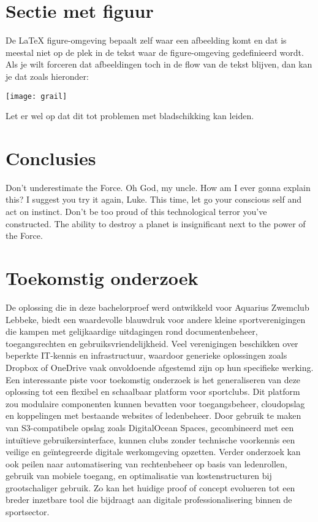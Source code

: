 \documentclass[a0,portrait]{hogent-poster}
\begin{document}
\begin{multicols}{2}
\section{Sectie met figuur}

De {\LaTeX} figure-omgeving bepaalt zelf waar een afbeelding komt en dat is meestal niet op de plek in de tekst waar de figure-omgeving gedefinieerd wordt. Als je wilt forceren dat afbeeldingen toch in de flow van de tekst blijven, dan kan je dat zoals hieronder:

\begin{center}
  \captionsetup{type=figure}
  \texttt{[image: grail]}
\end{center}

Let er wel op dat dit tot problemen met bladschikking kan leiden.

\section{Conclusies}

Don't underestimate the Force. Oh God, my uncle. How am I ever gonna explain this? I suggest you try it again, Luke. This time, let go your conscious self and act on instinct. Don't be too proud of this technological terror you've constructed. The ability to destroy a planet is insignificant next to the power of the Force.

\section{Toekomstig onderzoek}

De oplossing die in deze bachelorproef werd ontwikkeld voor Aquarius Zwemclub Lebbeke, 
biedt een waardevolle blauwdruk voor andere kleine sportverenigingen die kampen met gelijkaardige uitdagingen rond documentenbeheer, 
toegangsrechten en gebruiksvriendelijkheid. Veel verenigingen beschikken over beperkte IT-kennis en infrastructuur, 
waardoor generieke oplossingen zoals Dropbox of OneDrive vaak onvoldoende afgestemd zijn op hun specifieke werking. 
Een interessante piste voor toekomstig onderzoek is het generaliseren van deze oplossing tot een flexibel en schaalbaar platform voor sportclubs. 
Dit platform zou modulaire componenten kunnen bevatten voor toegangsbeheer, cloudopslag en koppelingen met bestaande websites of ledenbeheer. 
Door gebruik te maken van S3-compatibele opslag zoals DigitalOcean Spaces, gecombineerd met een intuïtieve gebruikersinterface, 
kunnen clubs zonder technische voorkennis een veilige en geïntegreerde digitale werkomgeving opzetten. 
Verder onderzoek kan ook peilen naar automatisering van rechtenbeheer op basis van ledenrollen, gebruik van mobiele toegang, 
en optimalisatie van kostenstructuren bij grootschaliger gebruik. Zo kan het huidige proof of concept evolueren tot een breder 
inzetbare tool die bijdraagt aan digitale professionalisering binnen de sportsector.

\end{multicols}
\end{document}

